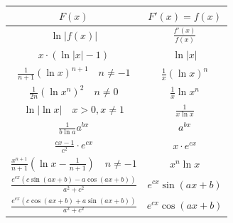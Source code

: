 \documentclass[a4paper,8pt]{extarticle}
\begin{document}
    
\begin{center}
        \begin{tabular}{|c|c|}
          \hline
                $F(x)$ & $F'(x) = f(x)$ \\
                \hline \hline
                
               
                $ \ln {| f(x) |} $   &   $ \frac{f'(x)}{f(x)} $ \\
                \hline
                $ x \cdot (\ln |x| - 1) $  &  $ \ln |x| $ \\
                \hline
                $ \frac{1}{n+1} (\ln x)^{n+1} \quad \scriptstyle  n \neq -1 $  &  $ \frac{1}{x}(\ln x)^n $ \\
                \hline
                $ \frac{1}{2n} (\ln x^n)^{2} \quad \scriptstyle  n \neq 0 $  &  $ \frac{1}{x}\ln x^n $ \\
                \hline
                $ \ln |\ln x| \quad \scriptstyle x>0,x\neq 1 $  &  $ \frac{1}{x \ln x} $ \\
                \hline
                $ \frac{1}{b \ln a} a^{bx} $  &  $ a^{bx} $ \\
                \hline
                $ \frac{cx-1}{c^2} \cdot e^{cx} $  &  $ x\cdot e^{cx} $ \\
                \hline
                $ \frac{x^{n+1}}{n+1} \left( \ln x - \frac{1}{n+1} \right) \quad \scriptstyle  n \neq -1 $  &  $ x^n \ln x $ \\
                \hline
                $ \frac{e^{cx} \left( c \sin (ax+b)-a \cos(ax+b) \right)}{a^2+c^2}  $  &  $ \scriptstyle e^{cx} \sin (ax+b)  $ \\
                \hline
                $ \frac{e^{cx} \left( c \cos (ax+b)+a \sin(ax+b) \right)}{a^2+c^2}  $ &  $ \scriptstyle e^{cx} \cos (ax+b)  $ \\
                \hline
        \end{tabular}
\end{center}
\end{document}
